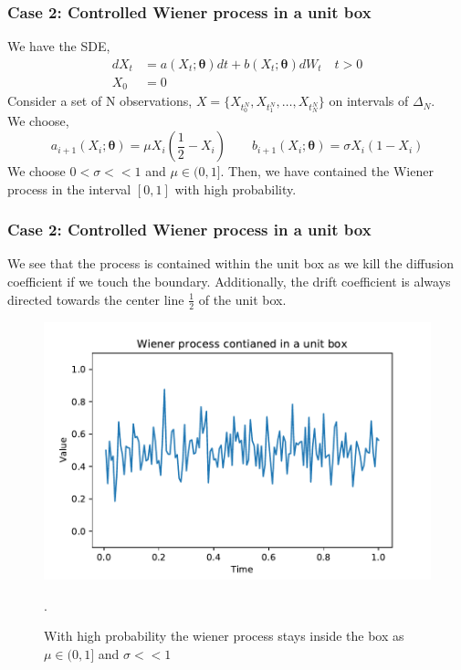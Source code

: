 \documentclass[aspectratio=169]{beamer}\usepackage[utf8]{inputenc}
\begin{document}
{\begin{frame}
\end{frame}



\begin{frame}\frametitle{Case 2: Controlled Wiener process in a unit box }
We have the SDE,
\begin{equation}
\begin{split}
dX_t &= a(X_t; \bm{\theta}) dt + b (X_t; \bm{\theta} ) dW_t \quad t > 0 \\
X_0 & = 0
\end{split}\label{main}
\end{equation}
Consider a set of N observations, $X= \{ X_{t_0^N} , X_{t_1^N} ,\ldots , X_{t_N^N} \}$ on intervals of $\Delta_N$.\\ We choose,
\begin{equation}
a_{i+1}(X_i; \bm{\theta})= \mu X_i(\frac{1}{2} - X_i)  \quad \quad b_{i+1} (X_i; \bm{\theta} )=\sigma X_i (1-X_i)
\end{equation}
We choose $ 0<\sigma <<1$ and $\mu\in (0,1]$. Then, we have contained the Wiener process in the interval $[0,1]$ with high probability.

\end{frame}


\begin{frame}\frametitle{Case 2: Controlled Wiener process in a unit box }
We see that the process is contained within the unit box as we kill the diffusion coefficient if we touch the boundary. Additionally, the drift coefficient is always directed towards the center line $\frac{1}{2}$ of the unit box.
\begin{figure}
  \includegraphics[scale=0.45]{Figures/Wiener_box.pdf}
  \caption{ With  high probability the wiener process stays inside the box as $\mu \in (0,1]$ and $\sigma << 1$ }.
\end{figure}


\end{frame}}
\end{document}

